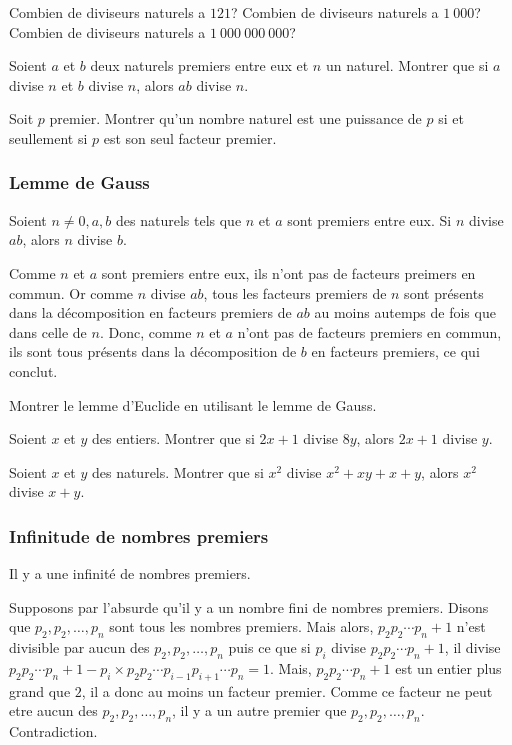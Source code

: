 \exo
Combien de diviseurs naturels a \(121\)?
Combien de diviseurs naturels a \(1\ 000\)?
Combien de diviseurs naturels a \(1\ 000\ 000\ 000\)?

\exo
Soient \(a\) et \(b\) deux naturels premiers entre eux et \(n\) un naturel. Montrer que si \(a\) divise \(n\) et \(b\) divise \(n\), alors \(ab\) divise \(n\).

\exo
Soit \(p\) premier. Montrer qu'un nombre naturel est une puissance de \(p\) si et seullement si \(p\) est son seul facteur premier.

\subsubsection{Lemme de Gauss}

Soient \(n \not= 0, a, b\) des naturels tels que \(n\) et \(a\) sont premiers entre eux. Si \(n\) divise \(ab\), alors \(n\) divise \(b\).

\endgroup

\preuve

Comme \(n\) et \(a\) sont premiers entre eux, ils n'ont pas de facteurs preimers en commun. Or comme \(n\) divise \(ab\), tous les facteurs premiers de \(n\) sont présents dans la décomposition en facteurs premiers de \(ab\) au moins autemps de fois que dans celle de \(n\). Donc, comme \(n\) et \(a\) n'ont pas de facteurs premiers en commun, ils sont tous présents dans la décomposition de \(b\) en facteurs premiers, ce qui conclut.

\exo
Montrer le lemme d'Euclide en utilisant le lemme de Gauss.

\exo
Soient \(x\) et \(y\) des entiers. Montrer que si \(2x+1\) divise \(8y\), alors \(2x+1\) divise \(y\).

\exo
Soient \(x\) et \(y\) des naturels. Montrer que si \(x^2\) divise \(x^2 + xy + x + y\), alors \(x^2\) divise \(x+y\).

\subsubsection{Infinitude de nombres premiers}
\thm

Il y a une infinité de nombres premiers.

\endgroup

\preuve

Supposons par l'absurde qu'il y a un nombre fini de nombres premiers. Disons que \(p_2 , p_2 , \ldots , p_{n}\) sont tous les nombres premiers. Mais alors, \(p_2 p_2 \cdots p_{n} + 1\) n'est divisible par aucun des \(p_2 , p_2 , \ldots , p_{n}\) puis ce que si \(p_{i}\) divise \(p_2 p_2 \cdots p_{n} + 1\), il divise \(p_2 p_2 \cdots p_{n} + 1 - p_{i} \times p_2 p_2 \cdots p_{i-1} p_{i+1} \cdots p_{n} = 1\). Mais, \(p_2 p_2 \cdots p_{n} + 1\) est un entier plus grand que \(2\), il a donc au moins un facteur premier. Comme ce facteur ne peut etre aucun des \(p_2 , p_2 , \ldots , p_{n}\), il y a un autre premier que \(p_2 , p_2 , \ldots , p_{n}\). Contradiction.

